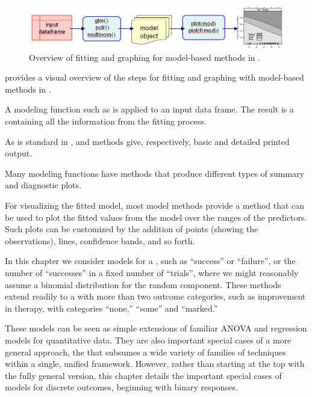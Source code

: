 \documentclass[11pt]{book}
\begin{document}
\begin{figure}
 \centering
 \includegraphics[width=\textwidth]{ch07/fig/goverview-R1}
 \caption{Overview of fitting and graphing for model-based methods in \R.
 }\label{fig:goverview}
\end{figure}

 provides a visual overview of the steps for fitting and
graphing with model-based methods in \R.  
\begin{seriate}
  \item A modeling function such as
 is applied to an input data frame.  The result is a 
containing all the information from the fitting process.  
  \item As is standard
in \R,  and  methods give, respectively, basic and
detailed printed output. 
  \item Many modeling functions have  methods 
that produce different types of summary and diagnostic plots.  
  \item For visualizing
the fitted model, most model methods provide a  method that can
be used to plot the fitted values from the model over the ranges of the
predictors.  Such plots can be customized by the addition of points 
(showing the observations), lines, confidence bands, and so forth.
\end{seriate}

In this chapter we consider models for a ,
such as ``success'' or ``failure'',
or the number of ``successes'' in a fixed number of ``trials'',
where we might reasonably assume a binomial distribution for the
random component.  These methods extend readily to
a  with more than two outcome categories,
such as improvement in therapy, with categories ``none,'' ``some''
and ``marked.''

These models can be seen as simple extensions of familiar ANOVA and
regression models for quantitative data.  They are also
important special cases of a more general approach, the
 that subsumes a wide variety
of families of techniques within a single, unified framework.
However, rather than starting at the top with the fully
general version, this chapter details the important special
cases of models for discrete outcomes, beginning with binary responses.
\end{document}
